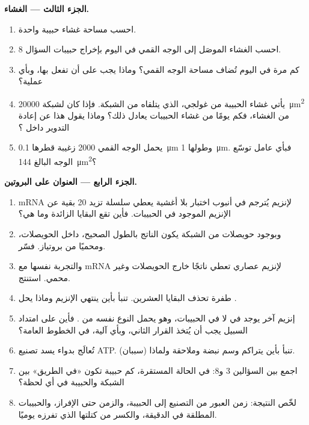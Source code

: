 \begin{problem}
\medskip
\noindent\textbf{الجزء الثالث --- الغشاء.}
\begin{enumerate}[resume]
  \item احسب مساحة غشاء حبيبة واحدة.
  \item احسب الغشاء الموصَل إلى الوجه القمي في اليوم بإخراج حبيبات
        السؤال 8.
  \item كم مرة في اليوم تُضاف مساحة الوجه القمي؟ وماذا يجب على
         أن تفعل بها، وبأي عملية؟
  \item يأتي غشاء الحبيبة من غولجي، الذي يتلقاه من الشبكة. فإذا كان
        لشبكة  \qty{20000}{\micro m^2} من الغشاء، فكم يومًا من
        غشاء الحبيبات يعادل ذلك؟ وماذا يقول هذا عن إعادة التدوير
        داخل ؟
  \item يحمل الوجه القمي \qty{2000}{} زغيبة قطرها
        \qty{0.1}{\micro m} وطولها \qty{1}{\micro m}. فبأي عامل
        توسّع الوجه البالغ \qty{144}{\micro m^2}؟
\end{enumerate}

\medskip
\noindent\textbf{الجزء الرابع --- العنوان على البروتين.}
\begin{enumerate}[resume]
  \item mRNA لإنزيم يُترجم في أنبوب اختبار بلا أغشية يعطي سلسلة تزيد
        \qty{20}{} بقية عن الإنزيم الموجود في الحبيبات. فأين تقع
        البقايا الزائدة وما هي؟
  \item وبوجود حويصلات من الشبكة يكون الناتج بالطول الصحيح، داخل
        الحويصلات، ومحميًا من بروتياز. فسّر.
  \item والتجربة نفسها مع mRNA لإنزيم عصاري تعطي ناتجًا خارج
        الحويصلات وغير محمي. استنتج.
  \item طفرة تحذف البقايا العشرين. تنبأ بأين ينتهي الإنزيم وماذا يحل
        .
  \item إنزيم آخر يوجد في  لا في الحبيبات، وهو يحمل
        النوع نفسه من . فأين على امتداد السبيل يجب أن
        يُتخذ القرار الثاني، وبأي آلية، في الخطوط العامة؟
  \item تُعالَج  بدواء يسد تصنيع ATP. تنبأ بأين يتراكم وسم نبضة
        وملاحقة ولماذا (سببان).
  \item اجمع بين السؤالين 3 و8: في الحالة المستقرة، كم حبيبة تكون
        «في الطريق» بين الشبكة والحبيبة في أي لحظة؟
  \item لخّص النتيجة: زمن العبور من التصنيع إلى الحبيبة، والزمن حتى
        الإفراز، والحبيبات المطلقة في الدقيقة، والكسر من كتلتها الذي
        تفرزه  يوميًا.
\end{enumerate}
\end{problem}
